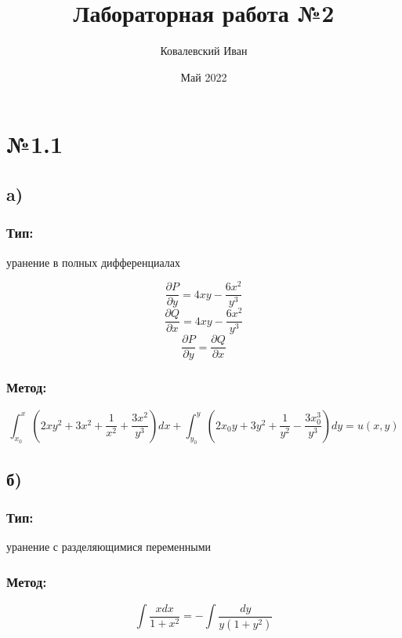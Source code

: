 \documentclass{article}
\title{Лабораторная работа №2}
\author{Ковалевский Иван}
\date{Май 2022}
\begin{document}
\maketitle

\section*{№1.1}
\subsection*{a)}
\subsubsection*{Тип:} 
уранение в полных дифференциалах

\begin{equation*}
\frac{\partial P}{\partial y}=4xy-\frac{6x^2}{y^3}
\end{equation*}
\begin{equation*}
\frac{\partial Q}{\partial x}=4xy-\frac{6x^2}{y^3}
\end{equation*}
\begin{equation*}
\frac{\partial P}{\partial y}=\frac{\partial Q}{\partial x}
\end{equation*}

\subsubsection*{Метод:}
\begin{equation*}
\int_{x_0}^{x}\left(2xy^2+3x^2+\frac{1}{x^2}+\frac{3x^2}{y^3}\right)dx+\int_{y_0}^{y}\left(2x_0y+3y^2+\frac{1}{y^2}-\frac{3x_0^3}{y^3}\right)dy=u(x,y)
\end{equation*}

\subsection*{б)}
\subsubsection*{Тип:} 
уранение с разделяющимися переменными

\subsubsection*{Метод:}
\begin{equation*}
\int \frac{xdx}{1+x^2}=-\int \frac{dy}{y(1+y^2)}
\end{equation*}
\end{document}
